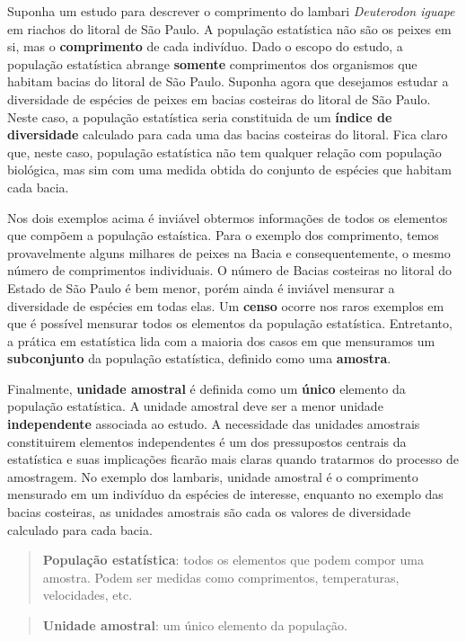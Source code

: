 \documentclass[
]{book}
\begin{document}
Suponha um estudo para descrever o comprimento do lambari \emph{Deuterodon iguape} em riachos do litoral de São Paulo. A população estatística não são os peixes em si, mas o \textbf{comprimento} de cada indivíduo. Dado o escopo do estudo, a população estatística abrange \textbf{somente} comprimentos dos organismos que habitam bacias do litoral de São Paulo. Suponha agora que desejamos estudar a diversidade de espécies de peixes em bacias costeiras do litoral de São Paulo. Neste caso, a população estatística seria constituida de um \textbf{índice de diversidade} calculado para cada uma das bacias costeiras do litoral. Fica claro que, neste caso, população estatística não tem qualquer relação com população biológica, mas sim com uma medida obtida do conjunto de espécies que habitam cada bacia.

Nos dois exemplos acima é inviável obtermos informações de todos os elementos que compõem a população estaística. Para o exemplo dos comprimento, temos provavelmente alguns milhares de peixes na Bacia e consequentemente, o mesmo número de comprimentos individuais. O número de Bacias costeiras no litoral do Estado de São Paulo é bem menor, porém ainda é inviável mensurar a diversidade de espécies em todas elas. Um \textbf{censo} ocorre nos raros exemplos em que é possível mensurar todos os elementos da população estatística. Entretanto, a prática em estatística lida com a maioria dos casos em que mensuramos um \textbf{subconjunto} da população estatística, definido como uma \textbf{amostra}.

Finalmente, \textbf{unidade amostral} é definida como um \textbf{único} elemento da população estatística. A unidade amostral deve ser a menor unidade \textbf{independente} associada ao estudo. A necessidade das unidades amostrais constituirem elementos independentes é um dos pressupostos centrais da estatística e suas implicações ficarão mais claras quando tratarmos do processo de amostragem. No exemplo dos lambaris, unidade amostral é o comprimento mensurado em um indivíduo da espécies de interesse, enquanto no exemplo das bacias costeiras, as unidades amostrais são cada os valores de diversidade calculado para cada bacia.

\begin{quote}
\textbf{População estatística}: todos os elementos que podem compor uma amostra. Podem ser medidas como comprimentos, temperaturas, velocidades, etc.
\end{quote}

\begin{quote}
\textbf{Unidade amostral}: um único elemento da população.
\end{quote}
\end{document}
